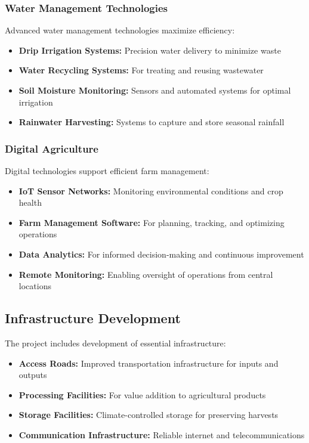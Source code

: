 \subsubsection{Water Management Technologies}

Advanced water management technologies maximize efficiency:

\begin{itemize}
    \item \textbf{Drip Irrigation Systems:} Precision water delivery to minimize waste
    \item \textbf{Water Recycling Systems:} For treating and reusing wastewater
    \item \textbf{Soil Moisture Monitoring:} Sensors and automated systems for optimal irrigation
    \item \textbf{Rainwater Harvesting:} Systems to capture and store seasonal rainfall
\end{itemize}

\subsubsection{Digital Agriculture}

Digital technologies support efficient farm management:

\begin{itemize}
    \item \textbf{IoT Sensor Networks:} Monitoring environmental conditions and crop health
    \item \textbf{Farm Management Software:} For planning, tracking, and optimizing operations
    \item \textbf{Data Analytics:} For informed decision-making and continuous improvement
    \item \textbf{Remote Monitoring:} Enabling oversight of operations from central locations
\end{itemize}

\subsection{Infrastructure Development}

The project includes development of essential infrastructure:

\begin{itemize}
    \item \textbf{Access Roads:} Improved transportation infrastructure for inputs and outputs
    \item \textbf{Processing Facilities:} For value addition to agricultural products
    \item \textbf{Storage Facilities:} Climate-controlled storage for preserving harvests
    \item \textbf{Communication Infrastructure:} Reliable internet and telecommunications
\end{itemize}

